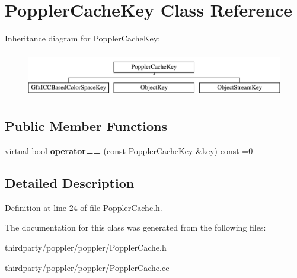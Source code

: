 \hypertarget{class_poppler_cache_key}{}\section{Poppler\+Cache\+Key Class Reference}
\label{class_poppler_cache_key}
Inheritance diagram for Poppler\+Cache\+Key\+:\begin{figure}[H]
\begin{center}
\leavevmode
\includegraphics[height=2.000000cm]{class_poppler_cache_key}
\end{center}
\end{figure}
\subsection*{Public Member Functions}
\begin{DoxyCompactItemize}
\item 
\mbox{\label{class_poppler_cache_key_a82d52c13cab2c3261547859988f99e12}} 
virtual bool {\bfseries operator==} (const \hyperlink{class_poppler_cache_key}{Poppler\+Cache\+Key} \&key) const =0
\end{DoxyCompactItemize}


\subsection{Detailed Description}


Definition at line 24 of file Poppler\+Cache.\+h.



The documentation for this class was generated from the following files\+:\begin{DoxyCompactItemize}
\item 
thirdparty/poppler/poppler/Poppler\+Cache.\+h\item 
thirdparty/poppler/poppler/Poppler\+Cache.\+cc\end{DoxyCompactItemize}
